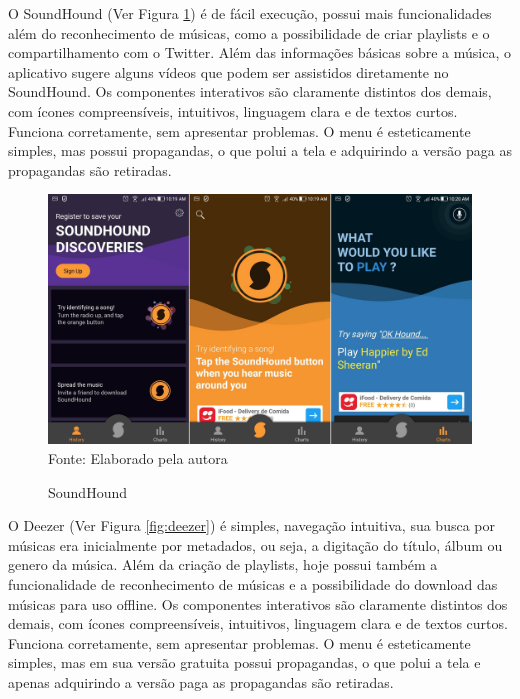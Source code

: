 O SoundHound (Ver Figura \ref{fig:soundHound}) é de fácil execução, possui mais funcionalidades além do reconhecimento de músicas, como a possibilidade de criar playlists e o compartilhamento com o Twitter. Além das informações básicas sobre a música, o aplicativo sugere alguns vídeos que podem ser assistidos diretamente no SoundHound. Os componentes interativos são claramente distintos dos demais, com ícones compreensíveis, intuitivos, linguagem clara e de textos curtos. Funciona corretamente, sem apresentar problemas. O menu é esteticamente simples, mas possui propagandas, o que polui a tela e adquirindo a versão paga as propagandas são retiradas.

\begin{figure}[!htb]
   \centering
   \caption{SoundHound}\label{fig:soundHound} 
   \includegraphics[scale=0.17]{figuras/soundhound.jpg}
   \\Fonte: Elaborado pela autora
\end{figure}

O Deezer (Ver Figura \ref{fig:deezer}) é simples, navegação intuitiva, sua busca por músicas era inicialmente por metadados, ou seja, a digitação do título, álbum ou genero da música. Além da criação de playlists, hoje possui também a funcionalidade de reconhecimento de músicas e a possibilidade do download das músicas para uso offline. Os componentes interativos são claramente distintos dos demais, com ícones compreensíveis, intuitivos, linguagem clara e de textos curtos. Funciona corretamente, sem apresentar problemas. O menu é esteticamente simples, mas em sua versão gratuita possui propagandas, o que polui a tela e apenas adquirindo a versão paga as propagandas são retiradas.


